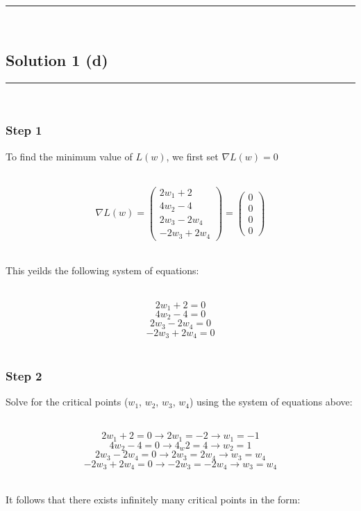\documentclass{article}
\begin{document}
\noindent\rule{\textwidth}{0.4pt}\\

\newpage

\subsection*{Solution 1 (d)}
\noindent\rule{\textwidth}{0.4pt}\\

\subsubsection*{Step 1}
\parbox{\textwidth}{
To find the minimum value of $L(w)$, we first set $\nabla L(w) = 0$}\\

$$\nabla L(w) = \begin{pmatrix} 
2w_1 + 2 \\
4w_2 - 4 \\
2w_3 - 2w_4 \\
-2w_3 + 2w_4
\end{pmatrix} = \begin{pmatrix} 
0 \\
0 \\
0 \\
0
\end{pmatrix}$$\\

\parbox{\textwidth}{
This yeilds the following system of equations:
}\\

$$2w_1 + 2 = 0$$
$$4w_2 - 4 = 0$$
$$2w_3 - 2w_4 = 0$$
$$-2w_3 + 2w_4 = 0$$\\

\subsubsection*{Step 2}
\parbox{\textwidth}{
Solve for the critical points ($w_1$, $w_2$, $w_3$, $w_4$) using the system of equations above:
}\\

$$2w_1 + 2 = 0 \rightarrow 2w_1 = -2 \rightarrow w_1 = -1$$
$$4w_2 - 4 = 0 \rightarrow 4_w2 = 4 \rightarrow w_2 = 1$$
$$2w_3 - 2w_4 = 0 \rightarrow 2w_3 = 2w_4 \rightarrow w_3 = w_4$$
$$-2w_3 + 2w_4 = 0 \rightarrow -2w_3 = -2w_4 \rightarrow w_3 = w_4$$\\

\parbox{\textwidth}{
It follows that there exists infinitely many critical points in the form:
}\\
\end{document}
